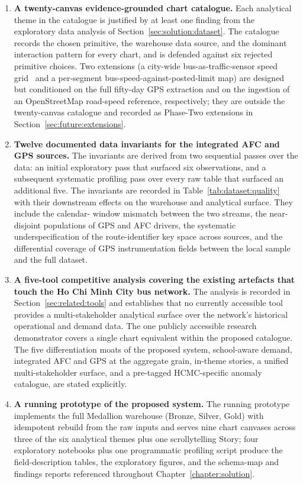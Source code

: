 \begin{enumerate}
    \item \textbf{A twenty-canvas evidence-grounded chart
    catalogue.} Each analytical theme in the catalogue is justified
    by at least one finding from the exploratory data analysis of
    Section~\ref{sec:solution:dataset}. The catalogue records the
    chosen primitive, the warehouse data source, and the dominant
    interaction pattern for every chart, and is defended against six
    rejected primitive choices. Two extensions (a city-wide
    bus-as-traffic-sensor speed grid~\cite{derevitskiy2016} and a
    per-segment bus-speed-against-posted-limit map) are designed but
    conditioned on the full fifty-day GPS extraction and on the
    ingestion of an OpenStreetMap road-speed reference, respectively;
    they are outside the twenty-canvas catalogue and recorded as
    Phase-Two extensions in Section~\ref{sec:future:extensions}.

    \item \textbf{Twelve documented data invariants for the
    integrated AFC and GPS sources.} The invariants are derived from
    two sequential passes over the data: an initial exploratory pass
    that surfaced six observations, and a subsequent systematic
    profiling pass over every raw table that surfaced an additional
    five. The invariants are recorded in
    Table~\ref{tab:dataset:quality} with their downstream effects on
    the warehouse and analytical surface. They include the calendar-
    window mismatch between the two streams, the near-disjoint
    populations of GPS and AFC drivers, the systematic
    underspecification of the route-identifier key space across
    sources, and the differential coverage of GPS instrumentation
    fields between the local sample and the full dataset.

    \item \textbf{A five-tool competitive analysis covering the
    existing artefacts that touch the Ho Chi Minh City bus network.}
    The analysis is recorded in
    Section~\ref{sec:related:tools} and establishes that no currently
    accessible tool provides a multi-stakeholder analytical surface
    over the network's historical operational and demand data. The
    one publicly accessible research demonstrator covers a single
    chart equivalent within the proposed catalogue. The five
    differentiation moats of the proposed system, school-aware demand,
    integrated AFC and GPS at the aggregate grain, in-theme stories,
    a unified multi-stakeholder surface, and a pre-tagged HCMC-specific
    anomaly catalogue, are stated explicitly.

    \item \textbf{A running prototype of the proposed system.} The
    running prototype implements the full Medallion warehouse (Bronze,
    Silver, Gold) with idempotent rebuild from the raw inputs and
    serves nine chart canvases across three of the six analytical
    themes plus one scrollytelling Story; four exploratory notebooks
    plus one programmatic profiling script produce the field-description
    tables, the exploratory figures, and the schema-map and findings
    reports referenced throughout Chapter~\ref{chapter:solution}.
\end{enumerate}
